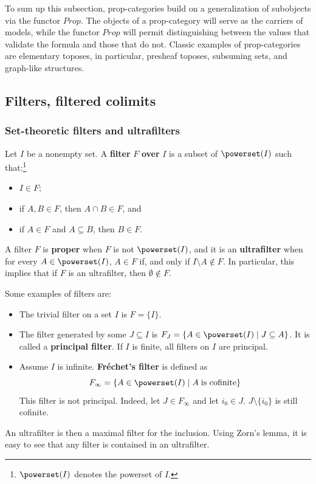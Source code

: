 \documentclass[preprint,3p,times]{elsarticle}
\begin{document}
To sum up this subsection, prop-categories build on a generalization of subobjects via the functor \(Prop\). The objects of a prop-category will serve as the carriers of models, while the functor \(Prop\) will permit distinguishing between the values that validate the formula and those that do not. Classic examples of prop-categories are elementary toposes, in particular, presheaf toposes, subsuming sets, and graph-like structures.

\subsection{Filters, filtered colimits}

\subsubsection{Set-theoretic filters and ultrafilters}

Let $I$ be a nonempty set. A {\bf filter} $F$ {\bf over} $I$ is a subset of $\powerset(I)$ such that:\footnote{$\powerset(I)$ denotes the powerset of $I$.}
\begin{itemize}
	\item $I \in F$;
	\item if $A,B \in F$, then $A \cap B \in F$, and
	\item if $A \in F$ and $A \subseteq B$, then $B \in F$.
\end{itemize}
A filter $F$ is {\bf proper} when $F$ is not $\powerset(I)$, and it is an {\bf ultrafilter} when for every $A \in \powerset(I)$, $A \in F$ if, and only if $I \setminus A \notin F$. In particular, this implies that if \(F\) is an ultrafilter, then $\emptyset \notin F$.

\medskip
Some examples of filters are:

\begin{itemize}
	\item The trivial filter on a set $I$ is $F = \{I\}$.
	\item The filter generated by some $J \subseteq I$ is $F_J = \{A \in \powerset(I) \mid J \subseteq A\}$. It is called a {\bf principal filter}. If $I$ is finite, all filters on $I$ are principal. 
	\item Assume $I$ is infinite. {\bf Fr\'echet's filter} is defined as 
	$$F_\infty = \{A \in \powerset(I) \mid A \; \mbox{is cofinite}\}$$ 
	This filter is not principal. Indeed, let $J \in F_\infty$ and let $i_0 \in J$. $J \setminus \{i_0\}$ is still cofinite. 
\end{itemize}
An ultrafilter is then a maximal filter for the inclusion. Using Zorn's lemma, it is easy to see that any filter is contained in an ultrafilter. 
\end{document}
